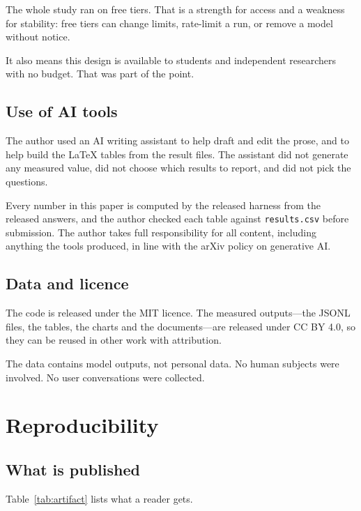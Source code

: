 \documentclass[11pt,a4paper]{article}
\begin{document}
The whole study ran on free tiers. That is a strength for access and a weakness for stability: free tiers can change limits, rate-limit a run, or remove a model without notice.

It also means this design is available to students and independent researchers with no budget. That was part of the point.

\subsection{Use of AI tools}

The author used an AI writing assistant to help draft and edit the prose, and to help build the \LaTeX{} tables from the result files. The assistant did not generate any measured value, did not choose which results to report, and did not pick the questions.

Every number in this paper is computed by the released harness from the released answers, and the author checked each table against \texttt{results.csv} before submission. The author takes full responsibility for all content, including anything the tools produced, in line with the arXiv policy on generative AI.

\subsection{Data and licence}

The code is released under the MIT licence. The measured outputs---the JSONL files, the tables, the charts and the documents---are released under CC BY 4.0, so they can be reused in other work with attribution.

The data contains model outputs, not personal data. No human subjects were involved. No user conversations were collected.

\section{Reproducibility}

\subsection{What is published}

Table~\ref{tab:artifact} lists what a reader gets.
\end{document}

